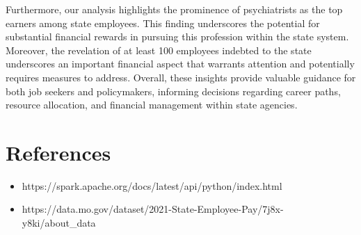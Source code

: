 \documentclass{article}
\begin{document}
Furthermore, our analysis highlights the prominence of psychiatrists as the top earners among state employees. This finding underscores the potential for substantial financial rewards in pursuing this profession within the state system. Moreover, the revelation of at least 100 employees indebted to the state underscores an important financial aspect that warrants attention and potentially requires measures to address. Overall, these insights provide valuable guidance for both job seekers and policymakers, informing decisions regarding career paths, resource allocation, and financial management within state agencies.

\section{References}
\begin{itemize}
    \item https://spark.apache.org/docs/latest/api/python/index.html 
    \item https://data.mo.gov/dataset/2021-State-Employee-Pay/7j8x-y8ki/about_data 
    
    
\end{itemize}
 
\end{document}
